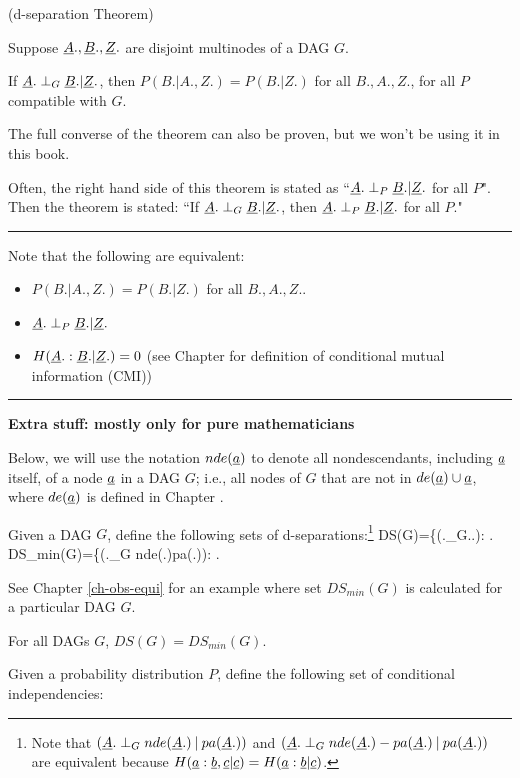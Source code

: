 \begin{claim}(d-separation Theorem)

Suppose
${\underline{A}}., {\underline{B}}., {\underline{Z}}.$
are disjoint multinodes
of a DAG  $G$.

If 
${\underline{A}}.\perp_G {\underline{B}}.|{\underline{Z}}.$, then
$P(B.|A., Z.)=P(B.|Z.)$
for all $B.,A., Z.$,
for all $P$
compatible with $G$.

\end{claim}
The full converse
of the theorem can also be 
proven, 
but we won't be using it
in this book.

Often, the right hand side
of this theorem is stated as 
``${\underline{A}}.\perp_P {\underline{B}}.|{\underline{Z}}.$
for all $P$".
Then the theorem is stated:
``If 
${\underline{A}}.\perp_G {\underline{B}}.|{\underline{Z}}.$, then
${\underline{A}}.\perp_P {\underline{B}}.|{\underline{Z}}.$ for all $P$."  

\hrule
Note that 
the following are equivalent:
\begin{itemize}
\item
$P(B.|A., Z.)=P(B.|Z.)$ for all $B., A., Z.$.
\item
${\underline{A}}.\perp_P {\underline{B}}.|{\underline{Z}}.$
\item
$H({\underline{A}}.:{\underline{B}}.|{\underline{Z}}.)=0$
(see Chapter 
for definition of
 conditional mutual information (CMI))
\end{itemize}
\hrule\noindent
{\bf Extra stuff: mostly only for 
 pure mathematicians}

Below, we will use
the notation $nde({\underline{a}})$
to denote
all nondescendants,
including ${\underline{a}}$ itself, 
of a node ${\underline{a}}$
in a DAG $G$; i.e.,
all nodes of $G$ that are not
in $de({\underline{a}})\cup {\underline{a}}$, where
$de({\underline{a}})$
is defined in Chapter .

Given a DAG $G$, define 
the following
sets of d-separations:\footnote{
Note that
$({\underline{A}}.\perp_G
nde({\underline{A}}.){\:\mathbf{|}\:} pa({\underline{A}}.))$ and
$({\underline{A}}.\perp_G
nde({\underline{A}}.)-pa({\underline{A}}.){\:\mathbf{|}\:} pa({\underline{A}}.))$
are
equivalent
because
$H({\underline{a}}:{\underline{b}}, {\underline{c}}|{\underline{c}})=
H({\underline{a}}:{\underline{b}}|{\underline{c}})$.
}
\beq
DS(G)=\{(\rvA.\perp_G\rvB.\cond\rvZ.):
\;.
\eeq
\beq
DS_{min}(G)=\{(\rvA.\perp_G
nde(\rvA.)\cond pa(\rvA.)):
\;.
\eeq

See Chapter \ref{ch-obs-equi}
for an example
where set $DS_{min}(G)$
is calculated for 
a particular DAG $G$.

\begin{claim}
For all DAGs $G$, $DS(G)=DS_{min}(G)$.
\end{claim}

Given a probability distribution  $P$, 
define the following
set of conditional independencies:


